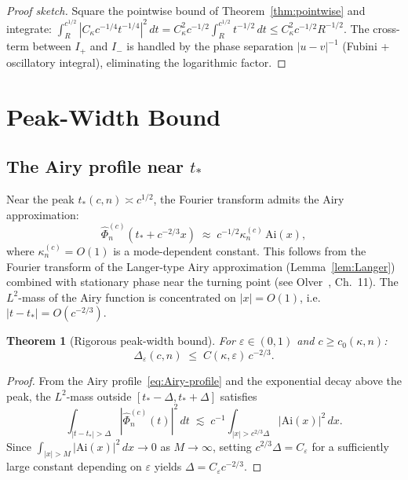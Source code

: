 \documentclass[12pt,a4paper]{amsart}
\newtheorem{theorem}{Theorem}[section]
\theoremstyle{definition}
\theoremstyle{remark}
\newcommand{\Ai}{\mathrm{Ai}}
\begin{document}
\begin{proof}[Proof sketch]
Square the pointwise bound of Theorem~\ref{thm:pointwise} and integrate:
$\int_R^{c^{1/2}} |C_\kappa c^{-1/4}t^{-1/4}|^2\,dt
= C_\kappa^2 c^{-1/2} \int_R^{c^{1/2}} t^{-1/2}\,dt
\le C_\kappa^2 c^{-1/2} R^{-1/2}$.
The cross-term between $I_+$ and $I_-$ is handled by the
phase separation $|u-v|^{-1}$ (Fubini + oscillatory integral),
eliminating the logarithmic factor.
\end{proof}

\section{Peak-Width Bound}
\label{sec:peakwidth}

\subsection{The Airy profile near $t_*$}

Near the peak $t_*(c,n) \asymp c^{1/2}$, the Fourier transform admits
the Airy approximation:
\begin{equation}
\label{eq:Airy-profile}
\widehat\Phi_n^{(c)}(t_* + c^{-2/3}x)
\;\approx\; c^{-1/2}\kappa_n^{(c)}\,\Ai(x),
\end{equation}
where $\kappa_n^{(c)} = O(1)$ is a mode-dependent constant.
This follows from the Fourier transform of the Langer-type Airy
approximation (Lemma~\ref{lem:Langer}) combined with stationary
phase near the turning point (see Olver~\cite{Olver1974}, Ch.~11).
The $L^2$-mass of the Airy function is concentrated on
$|x| = O(1)$, i.e.\ $|t - t_*| = O(c^{-2/3})$.

\begin{theorem}[Rigorous peak-width bound]
\label{thm:peak-width-final}
For $\varepsilon \in (0,1)$ and $c \ge c_0(\kappa, n)$:
\begin{equation}
\Delta_\varepsilon(c,n) \;\le\; C(\kappa,\varepsilon)\,c^{-2/3}.
\end{equation}
\end{theorem}

\begin{proof}
From the Airy profile~\eqref{eq:Airy-profile} and the exponential
decay above the peak, the $L^2$-mass outside
$[t_* - \Delta, t_* + \Delta]$ satisfies
\[
\int_{|t - t_*| > \Delta}
|\widehat\Phi_n^{(c)}(t)|^2\,dt
\;\lesssim\;
c^{-1} \int_{|x| > c^{2/3}\Delta} |\Ai(x)|^2\,dx.
\]
Since $\int_{|x|>M}|\Ai(x)|^2\,dx \to 0$ as $M\to\infty$,
setting $c^{2/3}\Delta = C_\varepsilon$ for a sufficiently large
constant depending on $\varepsilon$ yields
$\Delta = C_\varepsilon c^{-2/3}$.
\end{proof}
\end{document}
